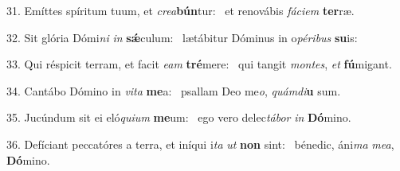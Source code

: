 31. Emíttes spíritum tuum, et \textit{cre}\textit{a}\textbf{bún}tur: \ast\  et renovábis \textit{fá}\textit{ci}\textit{em} \textbf{ter}ræ.\

32. Sit glória Dómi\textit{ni} \textit{in} \textbf{sǽ}culum: \ast\  lætábitur Dóminus in o\textit{pé}\textit{ri}\textit{bus} \textbf{su}is:\

33. Qui réspicit terram, et facit \textit{e}\textit{am} \textbf{tré}mere: \ast\  qui tangit \textit{mon}\textit{tes}, \textit{et} \textbf{fú}migant.\

34. Cantábo Dómino in \textit{vi}\textit{ta} \textbf{me}a: \ast\  psallam Deo me\textit{o}, \textit{quám}\textit{di}\textbf{u} sum.\

35. Jucúndum sit ei eló\textit{qui}\textit{um} \textbf{me}um: \ast\  ego vero delec\textit{tá}\textit{bor} \textit{in} \textbf{Dó}mino.\

36. Defíciant peccatóres a terra, et iníqui i\textit{ta} \textit{ut} \textbf{non} sint: \ast\  bénedic, áni\textit{ma} \textit{me}\textit{a}, \textbf{Dó}mino.\

